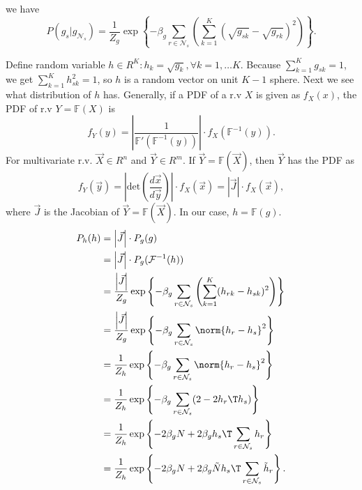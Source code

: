 \documentclass{article}
\begin{document}
we have
\begin{equation*}
  P(g_s | g_{\mathcal{N}_s}) = \frac{1}{Z_g} \exp \left \{ -\beta_g \sum_{r \in \mathcal{N}_s} \left ( \sum_{k = 1}^K (\sqrt{g_{sk}} - \sqrt{g_{rk}} )^2 \right )  \right \}. \label{eq:gdist}
\end{equation*}

Define random variable $h \in R^K: h_k = \sqrt{g_k}, \forall k = 1, \dots K$. Because $\sum_{k = 1}^K g_{sk} = 1$, we get $\sum_{k = 1}^K h_{sk}^2 = 1$, so $h$ is a random vector on unit $K-1$ sphere. Next we see what distribution of $h$ has. Generally, if a PDF of a r.v $X$ is given as $f_X(x)$, the PDF of r.v $Y = \mathbb{F}(X)$ is
\begin{equation*}
  f_Y(y) = \left |\frac{1}{\mathbb{F}'(\mathbb{F}^{-1} (y))} \right | \cdot f_X(\mathbb{F}^{-1} (y)).
\end{equation*}
For multivariate r.v. $\vec X\in R^n$ and $\vec Y \in R^m$. If $\vec Y = \mathbb{F}(\vec X)$, then $\vec Y$ has the PDF as
\begin{equation*}
  f_Y(\vec y) = \left | \textrm{det} \left ( \frac{d \vec x}{d\vec y}\right )  \right | \cdot  f_X(\vec x) = \left | \vec{J}\right | \cdot f_X(\vec x) ,
\end{equation*}
where $\vec J$ is the Jacobian of $\vec Y = \mathbb{F}(\vec X)$. In our case, $h = \mathbb{F}(g)$. 
\begin{align*}
  P_h(h) &= \left | \vec{J}\right | \cdot  P_g(g) \\
  &= \left | \vec{J}\right | \cdot  P_g(\mathcal{F}^{-1} (h))  \\
  &= \frac{\left | \vec{J}\right | }{Z_g} \exp \left \{ -\beta_g \sum_{r \in \mathcal{N}_s} \left ( \sum_{k = 1}^K (h_{rk} - h_{sk} )^2 \right )  \right \}\\
  &= \frac{\left | \vec{J}\right | }{Z_g} \exp \left \{ -\beta_g \sum_{r \in \mathcal{N}_s} \norm{ h_r - h_s}^2  \right \}\\
  &= \frac{1}{Z_h} \exp \left \{ -\beta_g \sum_{r \in \mathcal{N}_s} \norm{ h_r - h_s}^2  \right \}\\
  &= \frac{1}{Z_h} \exp \left \{ -\beta_g \sum_{r \in \mathcal{N}_s} (2 - 2 h_r\T h_s) \right \}\\
  &= \frac{1}{Z_h} \exp \left \{ -2 \beta_g N + 2\beta_g h_s\T \sum_{r \in \mathcal{N}_s}h_r \right \}\\
  &= \frac{1}{Z_h} \exp \left \{ -2 \beta_g N + 2\beta_g\tilde N  h_s \T \sum_{r \in \mathcal{N}_s}\tilde h_r \right \}.
\end{align*}
\end{document}
